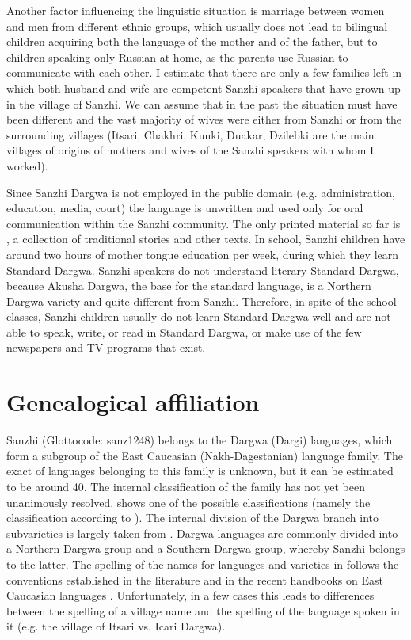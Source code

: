 Another factor influencing the linguistic situation is marriage between women and men from different ethnic groups, which usually does not lead to bilingual children acquiring both the language of the mother and of the father, but to children speaking only Russian at home, as the parents use Russian to communicate with each other. I estimate that there are only a few families left in which both husband and wife are competent Sanzhi speakers that have grown up in the village of Sanzhi. We can assume that in the past the situation must have been different and the vast majority of wives were either from Sanzhi or from the surrounding villages (Itsari, Chakhri, Kunki, Duakar, Dzilebki are the main villages of origins of mothers and wives of the Sanzhi speakers with whom I worked).

Since Sanzhi Dargwa is not employed in the public domain (e.g. administration, education, media,  court) the language is unwritten and used only for oral communication within the Sanzhi community. The only printed material so far is \citet{Forker.Gadzhimuradov2017}, a collection of traditional stories and other texts. In school, Sanzhi children have around two hours of mother tongue education per week, during which they learn Standard Dargwa. Sanzhi speakers do not understand literary Standard Dargwa, because Akusha Dargwa, the base for the standard language, is a Northern Dargwa variety and quite different from Sanzhi. Therefore, in spite of the school classes, Sanzhi children usually do not learn Standard Dargwa well and are not able to speak, write, or read in Standard Dargwa, or make use of the few newspapers and TV programs that exist.




\section{Genealogical affiliation}
\label{sec:Genealogical affiliation}

Sanzhi (Glottocode: sanz1248) belongs to the Dargwa (Dargi) languages, which form a subgroup of the East Caucasian (Nakh-Dagestanian) language family. The exact  of languages belonging to this family is unknown, but it can be estimated to be around 40. The internal classification of the family has not yet been unanimously resolved.  shows one of the possible classifications (namely the classification according to \citealt[xi]{Kibrik1996}). The internal division of the Dargwa branch into subvarieties is largely taken from \citet{Korjakov2006}. Dargwa languages are commonly divided into a Northern Dargwa group and a Southern Dargwa group, whereby Sanzhi belongs to the latter. The spelling of the names for languages and varieties in   follows the conventions established in the literature and in the recent handbooks on East Caucasian languages \citep{PolinskyInPress, KoryakovEtAllInPreparation}. Unfortunately, in a few cases this leads to differences between the spelling of a village name and the spelling of the language spoken in it (e.g. the village of Itsari vs. Icari Dargwa).

